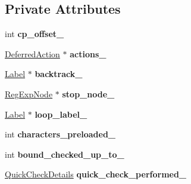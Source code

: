 \subsection*{Private Attributes}
\begin{DoxyCompactItemize}
\item 
int {\bfseries cp\+\_\+offset\+\_\+}\hypertarget{classv8_1_1internal_1_1_trace_af826498ee160a52a1487d4aa4aea240d}{}\label{classv8_1_1internal_1_1_trace_af826498ee160a52a1487d4aa4aea240d}

\item 
\hyperlink{classv8_1_1internal_1_1_trace_1_1_deferred_action}{Deferred\+Action} $\ast$ {\bfseries actions\+\_\+}\hypertarget{classv8_1_1internal_1_1_trace_a5dc7587ff0ff073c14405e908fa657e5}{}\label{classv8_1_1internal_1_1_trace_a5dc7587ff0ff073c14405e908fa657e5}

\item 
\hyperlink{classv8_1_1internal_1_1_label}{Label} $\ast$ {\bfseries backtrack\+\_\+}\hypertarget{classv8_1_1internal_1_1_trace_a04beb2836baec8cf7fb8f2ad0f801e73}{}\label{classv8_1_1internal_1_1_trace_a04beb2836baec8cf7fb8f2ad0f801e73}

\item 
\hyperlink{classv8_1_1internal_1_1_reg_exp_node}{Reg\+Exp\+Node} $\ast$ {\bfseries stop\+\_\+node\+\_\+}\hypertarget{classv8_1_1internal_1_1_trace_ab9b3b02adfa4f76a943258f942d19891}{}\label{classv8_1_1internal_1_1_trace_ab9b3b02adfa4f76a943258f942d19891}

\item 
\hyperlink{classv8_1_1internal_1_1_label}{Label} $\ast$ {\bfseries loop\+\_\+label\+\_\+}\hypertarget{classv8_1_1internal_1_1_trace_a96f8f5e104411237fdf288a5df11fd5c}{}\label{classv8_1_1internal_1_1_trace_a96f8f5e104411237fdf288a5df11fd5c}

\item 
int {\bfseries characters\+\_\+preloaded\+\_\+}\hypertarget{classv8_1_1internal_1_1_trace_a51f23490e8be1ca252d277ead52db9d1}{}\label{classv8_1_1internal_1_1_trace_a51f23490e8be1ca252d277ead52db9d1}

\item 
int {\bfseries bound\+\_\+checked\+\_\+up\+\_\+to\+\_\+}\hypertarget{classv8_1_1internal_1_1_trace_a46c50c0a303f6435cf5b4b994ad8740e}{}\label{classv8_1_1internal_1_1_trace_a46c50c0a303f6435cf5b4b994ad8740e}

\item 
\hyperlink{classv8_1_1internal_1_1_quick_check_details}{Quick\+Check\+Details} {\bfseries quick\+\_\+check\+\_\+performed\+\_\+}\hypertarget{classv8_1_1internal_1_1_trace_ae6b3df5f44b8a7a450a9d25462c9bfa0}{}\label{classv8_1_1internal_1_1_trace_ae6b3df5f44b8a7a450a9d25462c9bfa0}


\end{DoxyCompactItemize}
